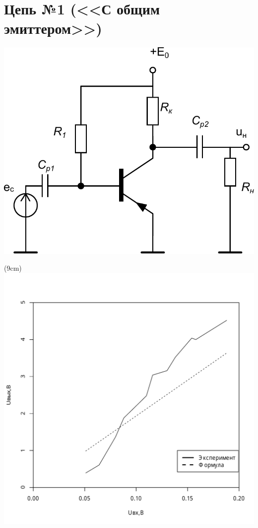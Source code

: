 \section{Цепь №1 (<<С общим эмиттером>>)}

\includegraphics[scale=0.35]{circuit1.pdf}

\sidefig(9cm){\includegraphics[scale=0.55]{d_1.pdf}}
{}

